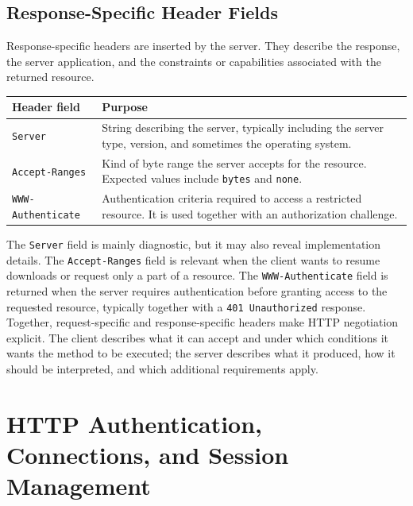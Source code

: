 \documentclass{scrbook}
\begin{document}
\newpage
\section{Response-Specific Header Fields}

Response-specific headers are inserted by the server. They describe the response, the server application, and the constraints or capabilities associated with the returned resource.

\begin{table}[!h]
	\begin{tabularx}{\linewidth}{p{}X}
	\textbf{Header field} & \textbf{Purpose} \\
	\hline
	
	\texttt{Server} & String describing the server, typically including the server type, version, and sometimes the operating system. \\ \hline
	
	\texttt{Accept-Ranges} & Kind of byte range the server accepts for the resource. Expected values include \texttt{bytes} and \texttt{none}. \\ \hline
	
	\texttt{WWW-Authenticate} & Authentication criteria required to access a restricted resource. It is used together with an authorization challenge. \\ \hline
	\end{tabularx}
\end{table}

The \texttt{Server} field is mainly diagnostic, but it may also reveal implementation details. The \texttt{Accept-Ranges} field is relevant when the client wants to resume downloads or request only a part of a resource. The \texttt{WWW-Authenticate} field is returned when the server requires authentication before granting access to the requested resource, typically together with a \texttt{401 Unauthorized} response.\\

Together, request-specific and response-specific headers make HTTP negotiation explicit. The client describes what it can accept and under which conditions it wants the method to be executed; the server describes what it produced, how it should be interpreted, and which additional requirements apply.

\chapter{HTTP Authentication, Connections, and Session Management}
\end{document}
